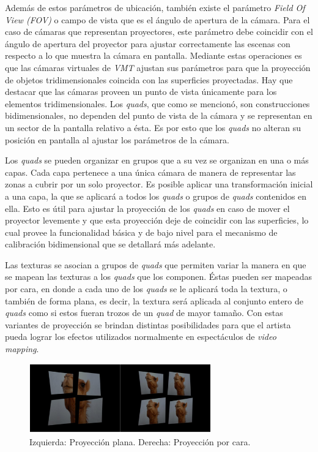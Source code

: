 Además de estos parámetros de ubicación, también existe el parámetro \emph{Field Of View (FOV)} o campo de vista que es el ángulo de apertura de la cámara. Para el caso de cámaras que representan proyectores, este parámetro debe coincidir con el ángulo de apertura del proyector para ajustar correctamente las escenas con respecto a lo que muestra la cámara en pantalla.
Mediante estas operaciones es que las cámaras virtuales de \emph{VMT} ajustan sus parámetros para que la proyección de objetos tridimensionales coincida con las superficies proyectadas.
Hay que destacar que las cámaras proveen un punto de vista únicamente para los elementos tridimensionales. Los \emph{quads}, que como se mencionó, son construcciones bidimensionales, no dependen del punto de vista de la cámara y se representan en un sector de la pantalla relativo a ésta. Es por esto que los \emph{quads} no alteran su posición en pantalla al ajustar los parámetros de la cámara.

Los \emph{quads} se pueden organizar en grupos que a su vez se organizan en una o más capas. Cada capa pertenece a una única cámara de manera de representar las zonas a cubrir por un solo proyector. Es posible aplicar una transformación inicial a una capa, la que se aplicará a todos los \emph{quads} o grupos de \emph{quads} contenidos en ella. Esto es útil para ajustar la proyección de los \emph{quads} en caso de mover el proyector levemente y que esta proyección deje de coincidir con las superficies, lo cual provee la funcionalidad básica y de bajo nivel para el mecanismo de calibración bidimensional que se detallará más adelante.

Las texturas se asocian a grupos de \emph{quads} que permiten variar la manera en que se mapean las texturas a los \emph{quads} que los componen. Éstas pueden ser mapeadas por cara, en donde a cada uno de los \emph{quads} se le aplicará toda la textura, o también de forma plana, es decir, la textura será aplicada al conjunto entero de \emph{quads} como si estos fueran trozos de un \emph{quad} de mayor tamaño.
Con estas variantes de proyección se brindan distintas posibilidades para que el artista pueda lograr los efectos utilizados normalmente en espectáculos de \emph{video mapping}.

\begin{figure}[H]
  \centering
    \includegraphics[width=0.7\textwidth]{./Cap5_vmt/vmtengine-maping.png}
  \caption{Izquierda: Proyección plana. Derecha: Proyección por cara.}%
  \label{fig:VMT-Projection}
\end{figure}

